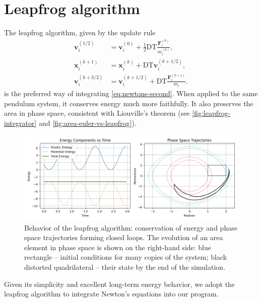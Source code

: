 \section{Leapfrog algorithm}
The leapfrog algorithm, given by the update rule \cite{young_leapfrog_2019}
\begin{equation}\label{eq:leapfrog}
    \begin{aligned}
        \mathbf{v}_{i}^{(1/2)} & = \mathbf{v}_i^{(0)} + \frac{1}{2}\textrm{DT} \frac{\mathbf{F}_i^{(0)}}{ m_i^{(0)}}, \\
        \mathbf{x}_i^{(k+1)}   & = \mathbf{x}_i^{(k)} + \textrm{DT} \mathbf{v}_i^{(k+1/2)},                           \\
        \mathbf{v}_i^{(k+3/2)} & = \mathbf{v}_i^{(k+1/2)} + \textrm{DT} \frac{ \mathbf{F}_i^{(k+1)}}{m_i}.
    \end{aligned}
\end{equation}
is the preferred way of integrating \autoref{eq:newtons-second}.
When applied to the same pendulum system, it conserves energy much more faithfully.
It also preserves the area in phase space, consistent with Liouville's theorem (see \autoref{fig:leapfrog-integrator} and \autoref{fig:area-euler-vs-leapfrog}).
\begin{figure}[htp]
    \centering
    \includegraphics[scale=0.6]{chapters/time-integration/img/leapfrog-pendulum.png}
    \caption{Behavior of the leapfrog algorithm: conservation of energy and phase space trajectories forming closed loops.
        The evolution of an area element in phase space is shown on the right-hand side: blue rectangle -- initial conditions for many copies of the system; black distorted quadrilateral -- their state by the end of the simulation.}
    \label{fig:leapfrog-integrator}
\end{figure}
Given its simplicity and excellent long-term energy behavior, we adopt the leapfrog algorithm to integrate Newton's equations into our program.